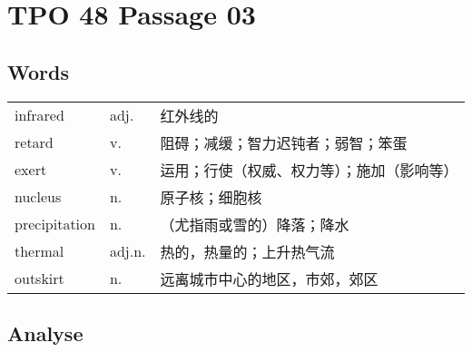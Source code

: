 \section{TPO 48 Passage 03}

\subsection{Words}

\begin{tabular}{lll}
    infrared      & adj.   & 红外线的                  \\
    retard        & v.     & 阻碍；减缓；智力迟钝者；弱智；笨蛋     \\
    exert         & v.     & 运用；行使（权威、权力等）；施加（影响等） \\
    nucleus       & n.     & 原子核；细胞核               \\
    precipitation & n.     & （尤指雨或雪的）降落；降水         \\
    thermal       & adj.n. & 热的，热量的；上升热气流          \\
    outskirt      & n.     & 远离城市中心的地区，市郊，郊区       \\
\end{tabular}

\subsection{Analyse}

